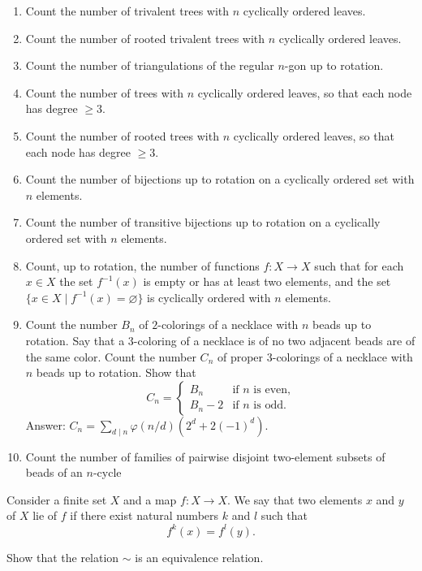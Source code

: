 \begin{enumerate}
\item Count the number of trivalent trees with $n$ cyclically ordered leaves.
\item Count the number of rooted trivalent trees with $n$ cyclically ordered leaves.
\item Count the number of triangulations of the regular $n$-gon up to rotation.
\item Count the number of trees with $n$ cyclically ordered leaves, so that each node has degree $\geq 3$.
\item Count the number of rooted trees with $n$ cyclically ordered leaves, so that each node has degree $\geq 3$.
\item Count the number of bijections up to rotation on a cyclically ordered set with $n$ elements.
\item Count the number of transitive bijections up to rotation on a cyclically ordered set with $n$ elements.
\item Count, up to rotation, the number of functions $f:X\to X$ such that for each $x\in X$ the set $f^{-1}(x)$ is empty or has at least two elements, and the set $\{x\in X\mid f^{-1}(x)=\varnothing\}$ is cyclically ordered with $n$ elements.
\item Count the number $B_n$ of $2$-colorings of a necklace with $n$ beads up to rotation. Say that a $3$-coloring of a necklace is  of no two adjacent beads are of the same color. Count the number $C_n$ of proper $3$-colorings of a necklace with $n$ beads up to rotation. Show that
  \begin{equation*}
    C_n =
    \begin{cases}
      B_n & \text{if $n$ is even,}\\
      B_n-2 & \text{if $n$ is odd.}
    \end{cases}
  \end{equation*}
  Answer: $C_n=\sum_{d\mid n}\varphi(n/d)(2^d+2(-1)^d)$.
\item Count the number of families of pairwise disjoint two-element subsets of beads of an $n$-cycle
\end{enumerate}

\exercises

\begin{routine}
  \exercise Consider a finite set $X$ and a map $f:X\to X$. We say that two elements $x$ and $y$ of $X$ lie  of $f$ if there exist natural numbers $k$ and $l$ such that
  \begin{equation*}
    f^k(x)=f^l(y).
  \end{equation*}
  \begin{subexenum}
  \item Show that the relation $\sim$ is an equivalence relation.
  \end{subexenum}
\end{routine}



